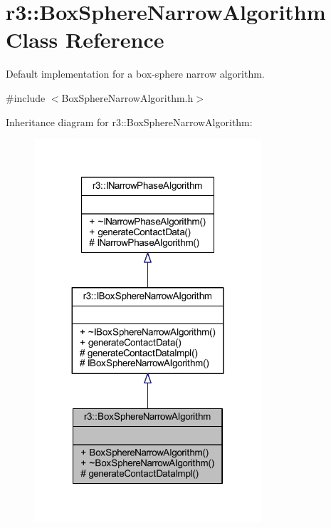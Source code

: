 \hypertarget{classr3_1_1_box_sphere_narrow_algorithm}{}\section{r3\+:\+:Box\+Sphere\+Narrow\+Algorithm Class Reference}
\label{classr3_1_1_box_sphere_narrow_algorithm}


Default implementation for a box-\/sphere narrow algorithm.  




{\ttfamily \#include $<$Box\+Sphere\+Narrow\+Algorithm.\+h$>$}



Inheritance diagram for r3\+:\+:Box\+Sphere\+Narrow\+Algorithm\+:\nopagebreak
\begin{figure}[H]
\begin{center}
\leavevmode
\includegraphics[width=239pt]{classr3_1_1_box_sphere_narrow_algorithm__inherit__graph}
\end{center}
\end{figure}


